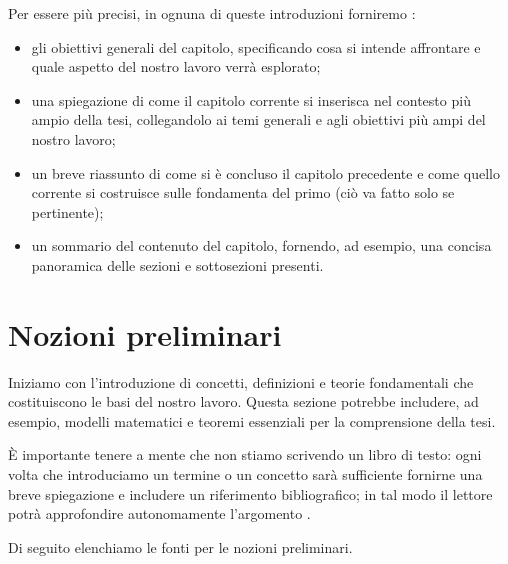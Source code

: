 \medskip

Per essere più precisi, in ognuna di queste introduzioni forniremo \cite{unibz2022thesis}:
\begin{itemize}

\item gli obiettivi generali del capitolo, specificando cosa si intende affrontare e quale aspetto del nostro lavoro verrà esplorato;

\item una spiegazione di come il capitolo corrente si inserisca nel contesto più ampio della tesi, collegandolo ai temi generali e agli obiettivi più ampi del nostro lavoro;

\item un breve riassunto di come si è concluso il capitolo precedente e come quello corrente si costruisce sulle fondamenta del primo (ciò va fatto solo se pertinente);

\item un sommario del contenuto del capitolo, fornendo, ad esempio, una concisa panoramica delle sezioni e sottosezioni presenti.

\end{itemize}

\section{Nozioni preliminari}

Iniziamo con l'introduzione di concetti, definizioni e teorie fondamentali che costituiscono le basi del nostro lavoro. Questa sezione potrebbe includere, ad esempio, modelli matematici e teoremi essenziali per la comprensione della tesi.

\medskip

È importante tenere a mente che non stiamo scrivendo un libro di testo: ogni volta che introduciamo un termine o un concetto sarà sufficiente fornirne una breve spiegazione e includere un riferimento bibliografico; in tal modo il lettore potrà approfondire autonomamente l'argomento \cite{tuni2019guide}.

\medskip

Di seguito elenchiamo le fonti per le nozioni preliminari.

